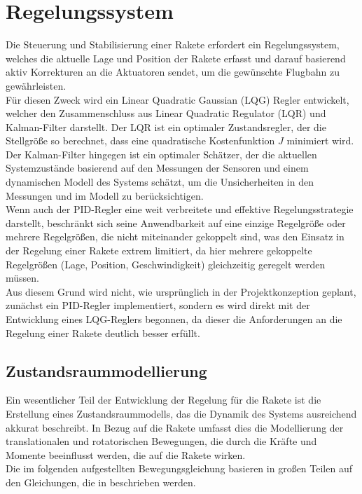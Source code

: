 \chapter{Regelungssystem}
\label{ch:regelungssystem}
Die Steuerung und Stabilisierung einer Rakete erfordert ein Regelungssystem, welches die aktuelle Lage und Position der Rakete erfasst und darauf basierend aktiv Korrekturen an die Aktuatoren sendet, um die gewünschte Flugbahn zu gewährleisten. 
\\
Für diesen Zweck wird ein Linear Quadratic Gaussian (LQG) Regler entwickelt, welcher den Zusammenschluss aus Linear Quadratic Regulator (LQR) und Kalman-Filter darstellt. Der LQR ist ein optimaler Zustandsregler, der die Stellgröße so berechnet, dass eine quadratische Kostenfunktion $J$ minimiert wird. Der Kalman-Filter hingegen ist ein optimaler Schätzer, der die aktuellen Systemzustände basierend auf den Messungen der Sensoren und einem dynamischen Modell des Systems schätzt, um die Unsicherheiten in den Messungen und im Modell zu berücksichtigen.
\\
Wenn auch der PID-Regler eine weit verbreitete und effektive Regelungsstrategie darstellt, beschränkt sich seine Anwendbarkeit auf eine einzige Regelgröße oder mehrere Regelgrößen, die nicht miteinander gekoppelt sind, was den Einsatz in der Regelung einer Rakete extrem limitiert, da hier mehrere gekoppelte Regelgrößen (Lage, Position, Geschwindigkeit) gleichzeitig geregelt werden müssen.
\\
Aus diesem Grund wird nicht, wie ursprünglich in der Projektkonzeption geplant, zunächst ein PID-Regler implementiert, sondern es wird direkt mit der Entwicklung eines LQG-Reglers begonnen, da dieser die Anforderungen an die Regelung einer Rakete deutlich besser erfüllt.
\section{Zustandsraummodellierung}
\label{sec:zustandsraummodellierung}
Ein wesentlicher Teil der Entwicklung der Regelung für die Rakete ist die Erstellung eines Zustandsraummodells, das die Dynamik des Systems ausreichend akkurat beschreibt. In Bezug auf die Rakete umfasst dies die Modellierung der translationalen und rotatorischen Bewegungen, die durch die Kräfte und Momente beeinflusst werden, die auf die Rakete wirken. 
\\
Die im folgenden aufgestellten Bewegungsgleichung basieren in großen Teilen auf den Gleichungen, die in \parencite{AliyuAliyuStateSpace} beschrieben werden.

